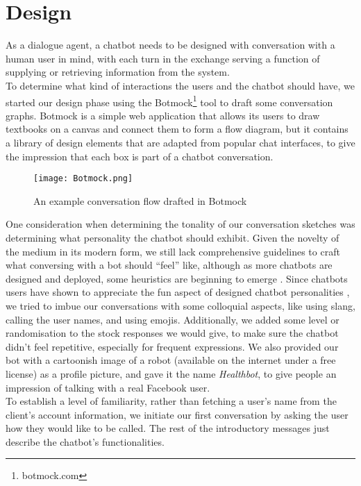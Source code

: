 \section{Design}
As a dialogue agent, a chatbot needs to be designed with conversation with a human user in mind, with each turn in the exchange serving a function of supplying or retrieving information from the system. \\
To determine what kind of interactions the users and the chatbot should have, we started our design phase using the Botmock\footnote{botmock.com} tool to draft some conversation graphs. Botmock is a simple web application that allows its users to draw textbooks on a canvas and connect them to form a flow diagram, but it contains a library of design elements that are adapted from popular chat interfaces, to give the impression that each box is part of a chatbot conversation. \\
\begin{figure}[h!]
  \texttt{[image: Botmock.png]}
  \caption{An example conversation flow drafted in Botmock}
\end{figure}
One consideration when determining the tonality of our conversation sketches was determining what personality the chatbot should exhibit. Given the novelty of the medium in its modern form, we still lack comprehensive guidelines to craft what conversing with a bot should ``feel'' like, although as more chatbots are designed and deployed, some heuristics are beginning to emerge \cite{jessie}. Since chatbots users have shown to appreciate the fun aspect of designed chatbot personalities \cite{10.1007/978-3-319-67744-6_28}, we tried to imbue our conversations with some colloquial aspects, like using slang, calling the user names, and using emojis. Additionally, we added some level or randomisation to the stock responses we would give, to make sure the chatbot didn't feel repetitive, especially for frequent expressions. We also provided our bot with a cartoonish image of a robot (available on the internet under a free license) as a profile picture, and gave it the name \textit{Healthbot}, to give people an impression of talking with a real Facebook user. \\
To establish a level of familiarity, rather than fetching a user's name from the client's account information, we initiate our first conversation by asking the user how they would like to be called. The rest of the introductory messages just describe the chatbot's functionalities.
